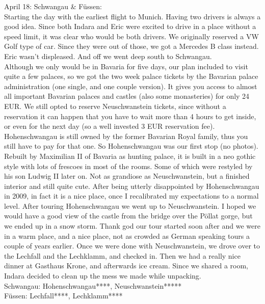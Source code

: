 April 18: Schwangau \& F\"ussen:\\
Starting the day with the earliest flight to Munich. Having two drivers is always a good idea. Since both Indara and Eric were excited to drive in a place without a speed limit, it was clear who would be both drivers. We originally reserved a VW Golf type of car. Since they were out of those, we got a Mercedes B class instead. Eric wasn't displeased. And off we went deep south to Schwangau.\\
 Although we only would be in Bavaria for five days, our plan included to visit quite a few palaces, so we got the two week palace tickets by the Bavarian palace administration (one single, and one couple version). It gives you access to almost all important Bavarian palaces and castles (also some monasteries) for only 24 EUR. We still opted to reserve Neuschwanstein tickets, since without a reservation it can happen that you have to wait more than 4 hours to get inside, or even for the next day (so a well invested 3 EUR reservation fee). Hohenschwangau is still owned by the former Bavarian Royal family, thus you still have to pay for that one. So Hohenschwangau was our first stop (no photos). Rebuilt by Maximilian II of Bavaria as hunting palace, it is built in a neo gothic style with lots of frescoes in most of the rooms. Some of which were restyled by his son Ludwig II later on. Not as grandiose as Neuschwanstein, but a finished interior and still quite cute. After being utterly disappointed by Hohenschwangau in 2009, in fact it is a nice place, once I recalibrated my expectations to a normal level. After touring Hohenschwangau we went up to Neuschwanstein. I hoped we would have a good view of the castle from the bridge over the P\"ollat gorge, but we ended up in a snow storm. Thank god our tour started soon after and we were in a warm place, and a nice place, not as crowded as German speaking tours a couple of years earlier. Once we were done with Neuschwanstein, we drove over to the Lechfall and the Lechklamm, and checked in. Then we had a really nice dinner at Gasthaus Krone, and afterwards ice cream. Since we shared a room, Indara decided to clean up the mess we made while unpacking.\\

Schwangau: Hohenschwangau****, Neuschwanstein*****\\
F\"ussen: Lechfall****, Lechklamm****\\

